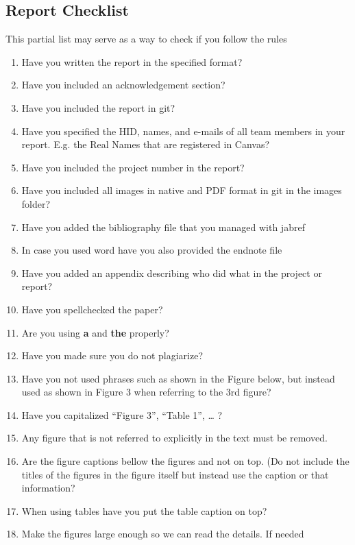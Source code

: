 \subsection{Report Checklist}\label{report-checklist}

This partial list may serve as a way to check if you follow the rules

\begin{enumerate}

\item
  Have you written the report in the specified format?
\item
  Have you included an acknowledgement section?
\item
  Have you included the report in git?
\item
  Have you specified the HID, names, and e-mails of all team members in
  your report. E.g. the Real Names that are registered in Canvas?
\item
  Have you included the project number in the report?
\item
  Have you included all images in native and PDF format in git in the
  images folder?
\item
  Have you added the bibliography file that you managed with jabref
\item
  In case you used word have you also provided the endnote file
\item
  Have you added an appendix describing who did what in the project or
  report?
\item
  Have you spellchecked the paper?
\item
  Are you using \textbf{a} and \textbf{the} properly?
\item
  Have you made sure you do not plagiarize?
\item
  Have you not used phrases such as shown in the Figure below, but
  instead used as shown in Figure 3 when referring to the 3rd figure?
\item
  Have you capitalized ``Figure 3'', ``Table 1'', \ldots{} ?
\item
  Any figure that is not referred to explicitly in the text must be
  removed.
\item
  Are the figure captions bellow the figures and not on top. (Do not
  include the titles of the figures in the figure itself but instead use
  the caption or that information?
\item
  When using tables have you put the table caption on top?
\item
  Make the figures large enough so we can read the details. If needed

\end{enumerate}
